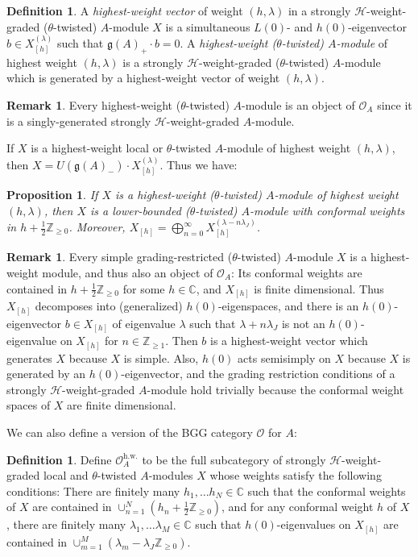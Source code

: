 \documentclass[11pt, reqno]{amsart}
\newtheorem{prop}[thm]{Proposition}
\theoremstyle{definition}\newtheorem{defi}[thm]{Definition}
\theoremstyle{definition}\newtheorem{rem}[thm]{Remark}
\theoremstyle{definition}\newtheorem{exam}[thm]{Example}
\theoremstyle{definition}\newtheorem{assum}[thm]{Assumption}
\newcommand{\cH}{\mathcal{H}}
\newcommand{\cO}{\mathcal{O}}
\newcommand{\CC}{\mathbb{C}}
\newcommand{\ZZ}{\mathbb{Z}}
\begin{document}
\begin{defi}
A \textit{highest-weight vector} of weight $(h,\lambda)$ in a strongly $\cH$-weight-graded ($\theta$-twisted) $A$-module $X$ is a simultaneous $L(0)$- and $h(0)$-eigenvector $b\in X^{(\lambda)}_{[h]}$ such that $\mathfrak{g}(A)_+\cdot b=0$. A \textit{highest-weight ($\theta$-twisted) $A$-module} of highest weight $(h,\lambda)$ is a strongly $\cH$-weight-graded ($\theta$-twisted) $A$-module which is generated by a highest-weight vector of weight $(h,\lambda)$. 
\end{defi}

\begin{rem}\label{rem:hw_in_OA}
Every highest-weight ($\theta$-twisted) $A$-module is an object of $\cO_A$ since it is a singly-generated strongly $\cH$-weight-graded $A$-module.
\end{rem}

If $X$ is a highest-weight local or $\theta$-twisted $A$-module of highest weight $(h,\lambda)$, then $X=U(\mathfrak{g}(A)_-)\cdot X^{(\lambda)}_{[h]}$. Thus we have:
\begin{prop}\label{prop:grading_of_hw_mods}
If $X$ is a highest-weight ($\theta$-twisted) $A$-module of highest weight $(h,\lambda)$, then $X$ is a lower-bounded ($\theta$-twisted) $A$-module with conformal weights in $h+\frac{1}{2}\ZZ_{\geq 0}$. Moreover, $X_{[h]}=\bigoplus_{n=0}^\infty X_{[h]}^{(\lambda-n\lambda_J)}$.
\end{prop} 


\begin{rem}\label{rem:simple_grad-rest_are_hw}
Every simple grading-restricted ($\theta$-twisted) $A$-module $X$ is a highest-weight module, and thus also an object of $\cO_A$: Its conformal weights are contained in $h+\frac{1}{2}\ZZ_{\geq 0}$ for some $h\in\CC$, and $X_{[h]}$ is finite dimensional. Thus $X_{[h]}$ decomposes into (generalized) $h(0)$-eigenspaces, and there is an $h(0)$-eigenvector $b\in X_{[h]}$ of eigenvalue $\lambda$ such that $\lambda+n\lambda_J$ is not an $h(0)$-eigenvalue on $X_{[h]}$ for $n\in\ZZ_{\geq 1}$. Then $b$ is a highest-weight vector which generates $X$ because $X$ is simple. Also, $h(0)$ acts semisimply on $X$ because $X$ is generated by an $h(0)$-eigenvector, and the grading restriction conditions of a strongly $\cH$-weight-graded $A$-module hold trivially because the conformal weight spaces of $X$ are finite dimensional.
\end{rem}

We can also define a version of the BGG category $\cO$ for $A$:
\begin{defi}
Define $\cO_{A}^{\mathrm{h.w.}}$ to be the full subcategory of strongly $\cH$-weight-graded local and $\theta$-twisted $A$-modules $X$ whose weights satisfy the following conditions: There are finitely many $h_1,\ldots h_N\in\CC$ such that the conformal weights of $X$ are contained in $\cup_{n=1}^N (h_n+\frac{1}{2}\ZZ_{\geq 0})$, and for any conformal weight $h$ of $X$, there are finitely many $\lambda_1,\ldots\lambda_M\in\CC$ such that $h(0)$-eigenvalues on $X_{[h]}$ are contained in $\cup_{m=1}^M (\lambda_m-\lambda_J\ZZ_{\geq 0})$.
\end{defi}
\end{document}
